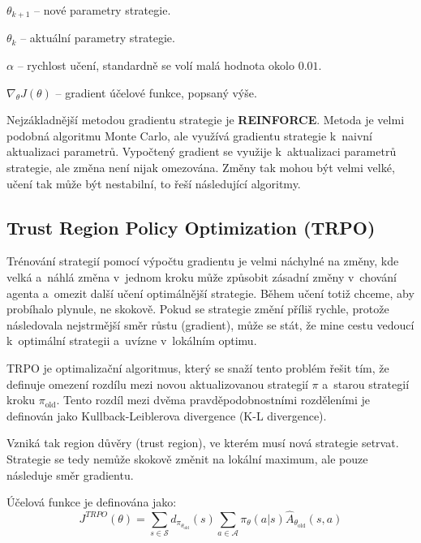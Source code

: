 \begin{myitemize}
  \item $\theta_{k+1}$ -- nové parametry strategie.
  \item $\theta_k$ -- aktuální parametry strategie.
  \item $\alpha$ -- rychlost učení, standardně se volí malá hodnota okolo $0.01$.
  \item $\nabla_\theta J(\theta)$ -- gradient účelové funkce, popsaný výše.
\end{myitemize}

Nejzákladnější metodou gradientu strategie je \textbf{REINFORCE}.
Metoda je velmi podobná algoritmu Monte Carlo, ale využívá gradientu strategie k~naivní aktualizaci parametrů.
Vypočtený gradient se využije k~aktualizaci parametrů strategie, ale změna není nijak omezována.
Změny tak mohou být velmi velké, učení tak může být nestabilní, to řeší následující algoritmy.

\pagebreak

\subsection{Trust Region Policy Optimization (TRPO)}\label{sec:trust-region-policy-optimization}
Trénování strategií pomocí výpočtu gradientu je velmi náchylné na změny, kde velká a~náhlá změna v~jednom kroku může způsobit zásadní změny v~chování agenta a~omezit další učení optimálnější strategie.
Během učení totiž chceme, aby probíhalo plynule, ne skokově.
Pokud se strategie změní příliš rychle, protože následovala nejstrmější směr růstu (gradient), může se stát, že mine cestu vedoucí k~optimální strategii a~uvízne v~lokálním optimu.

TRPO je optimalizační algoritmus, který se snaží tento problém řešit tím, že definuje omezení rozdílu mezi novou aktualizovanou strategií \textbf{$\pi$} a~starou strategií kroku \textbf{$\pi_{\text{old}}$}.
Tento rozdíl mezi dvěma pravděpodobnostními rozděleními je definován jako Kullback-Leiblerova divergence (K-L divergence)\cite{KL_divergence}.

Vzniká tak region důvěry (trust region), ve kterém musí nová strategie setrvat.
Strategie se tedy nemůže skokově změnit na lokální maximum, ale pouze následuje směr gradientu.

Účelová funkce je definována jako:
\begin{equation}
  J^{TRPO}(\theta) = \sum_{s \in \mathcal{S}} d_{\pi_{\theta_{\text{old}}}}(s) \sum_{a \in \mathcal{A}} \pi_{\theta}(a \vert s) \hat{A}_{\theta_{\text{old}}}(s, a)
\end{equation}

